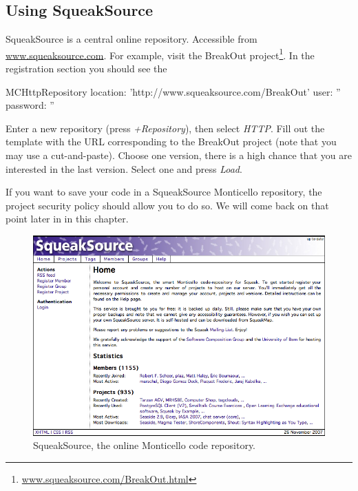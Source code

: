 \documentclass[a4paper,10pt,twoside]{book}
\begin{document}
\subsection{Using SqueakSource}

SqueakSource is a central online repository. Accessible from \href{http://www.squeaksource.com}{www.squeaksource.com}. For example, visit the BreakOut project\footnote{\href{http://www.squeaksource.com/BreakOut.html}{www.squeaksource.com/BreakOut.html}}. In the registration section you should see the 

\begin{code}

MCHttpRepository
    location: 'http://www.squeaksource.com/BreakOut'
    user: ''
    password: ''
\end{code}

Enter a new repository (press \emph{+Repository}), then select \emph{HTTP}. Fill out the template with the URL corresponding to the BreakOut project (note that you may use a cut-and-paste). Choose one version, there is a high chance that you are interested in the last version. Select one and press \emph{Load}.

If you want to save your code in a SqueakSource Monticello repository, the project security policy should allow you to do so. We will come back on that point later in  in this chapter.



\begin{figure}[ht]\centering
	\includegraphics[width=.75\linewidth]{squeaksource2}
	\caption{SqueakSource, the online Monticello code repository.}
\end{figure}
\end{document}
